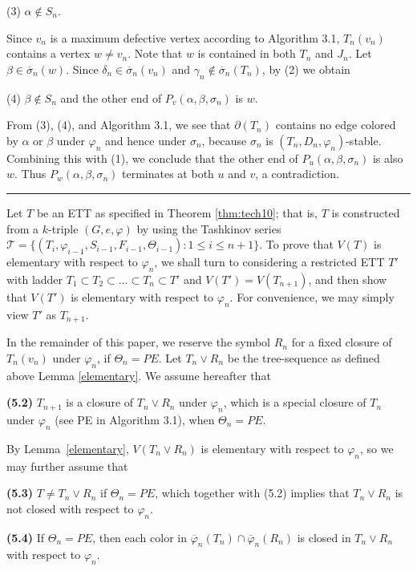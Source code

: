 \documentclass[11pt]{article}
\newcommand{\TT}{\mathcal {T}}
\newcommand{\phiv}{\varphi}
\def\qed{\hfill \rule{4pt}{7pt}}
\begin{document}
(3) $\alpha\notin S_n$. 

Since $v_n$ is a maximum defective vertex according to Algorithm 3.1, $T_{n}(v_n)$ contains a vertex $w \ne v_n$. Note that $w$ is contained in
both $T_n$ and $J_n$. Let $\beta \in \overline{\sigma}_n(w)$. Since  $\delta_n \in \overline{\sigma}_n(v_n)$
and $\gamma_n\notin \overline{\sigma}_n(T_n)$, by (2)  we obtain

(4) $\beta \notin S_n$ and the other end of $P_v(\alpha, \beta, \sigma_n)$ is $w$.

From (3), (4), and Algorithm 3.1, we see that $\partial(T_n)$ contains no edge colored by $\alpha$ or 
$\beta$ under $\varphi_{n}$ and hence under $\sigma_n$, because $\sigma_n$ is $(T_n,D_n,\varphi_n)$-stable. 
Combining this with (1), we conclude that the other end of $P_u(\alpha, \beta, \sigma_n)$ is 
also $w$. Thus $P_w(\alpha, \beta, \sigma_n)$ terminates at both $u$ and $v$, a contradiction. \qed 

\vskip 3mm

Let $T$ be an ETT as specified in Theorem \ref{thm:tech10}; that is, $T$ is constructed from a $k$-triple $(G,e, \varphi)$ 
by using the Tashkinov series $\TT=\{(T_i, \phiv_{i-1}, S_{i-1}, F_{i-1}, \Theta_{i-1}): 1\le i \le n+1\}$. To prove that
$V(T)$ is elementary with respect to $\phiv_n$, we shall turn to considering a restricted ETT $T'$ with 
ladder $T_1\subset T_2 \subset \ldots \subset T_n \subset T'$ and $V(T')=V(T_{n+1})$, and then show that 
$V(T')$ is elementary with respect to $\phiv_n$. For convenience, we may simply view $T'$ as $T_{n+1}$.   

\vskip 2mm
In the remainder of this paper, we reserve the symbol $R_n$ for a fixed closure of $T_n(v_n)$ under $\phiv_n$, if
$\Theta_n=PE$. Let $T_n\vee R_n$ be the tree-sequence as defined above Lemma \ref{elementary}. We assume hereafter that

{\bf (5.2)} $T_{n+1}$ is a closure of $T_n\vee R_n$ under $\phiv_n$, which is a special closure of $T_n$ under $\phiv_n$
(see PE in Algorithm 3.1), when $\Theta_n=PE$.

By Lemma~\ref{elementary}, $V(T_n\vee R_n)$ is elementary with respect to $\varphi_n$, so we may further assume that

{\bf (5.3)} $T \ne T_n\vee R_n$ if $\Theta_n=PE$, which together with (5.2) implies that $T_n\vee R_n$ is not
closed with respect to $\varphi_n$.  

{\bf (5.4)} If $\Theta_n = PE$, then each color in $\overline{\varphi}_n(T_n) \cap \overline{\varphi}_n(R_n)$ is 
closed in $T_n \vee R_n$ with respect to $\varphi_n$. 
\end{document}
